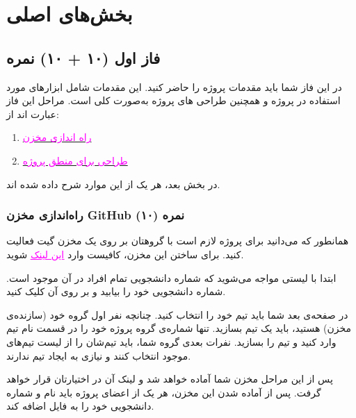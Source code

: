 \documentclass[]{article}
\begin{document}
\section*{{\titr بخش‌های اصلی }}


\subsection*{{\titr فاز اول} (۱۰ + ۱۰) نمره} 

در این فاز شما باید مقدمات پروژه را حاضر کنید. این مقدمات شامل ابزارهای مورد استفاده در پروژه و همچنین طراحی  های پروژه به‌صورت کلی است. مراحل این فاز عبارت اند از:

\begin{enumerate}
	\item
	\hyperref[subsubsec:github]{\textcolor{magenta}{راه اندازی مخزن }}
	
	\item
	\hyperref[subsubsec:fsm]{\textcolor{magenta}{طراحی  برای منطق پروژه}}
\end{enumerate}

در بخش بعد، هر یک از این موارد شرح داده شده اند.



\subsubsection*{{\titr راه‌اندازی مخزن GitHub} (۱۰) نمره}
\label{subsubsec:github}

همانطور که می‌دانید برای پروژه لازم است با گروهتان بر روی یک مخزن  گیت فعالیت کنید. برای ساختن این مخزن، کافیست وارد
\href{https://classroom.github.com/a/rBR982eM}{\textcolor{magenta}{\underline{این لینک}}} 
شوید.

ابتدا با لیستی مواجه می‌شوید که شماره دانشجویی تمام افراد در آن موجود است. شماره دانشجویی خود را بیابید و بر روی آن کلیک کنید.


در صفحه‌ی بعد شما باید تیم خود را انتخاب کنید. چنانچه نفر اول گروه خود (سازنده‌ی مخزن) هستید، باید یک تیم بسازید. تنها شماره‌ی گروه پروژه خود را در قسمت نام تیم وارد کنید و تیم را بسازید. نفرات بعدی گروه شما، باید تیم‌شان را از لیست تیم‌های موجود انتخاب کنند و نیازی به ایجاد تیم ندارند.

پس از این مراحل مخزن شما آماده خواهد شد و لینک آن در اختیارتان قرار خواهد گرفت. پس از آماده شدن این مخزن، هر یک از اعضای پروژه باید نام و شماره دانشجویی خود را به فایل  اضافه کند.
\end{document}
